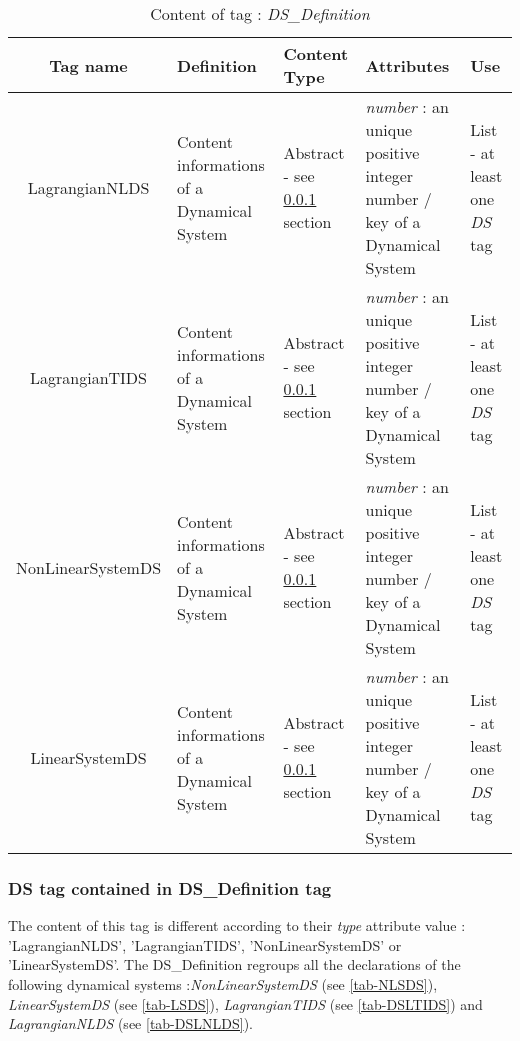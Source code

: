 \begin{table}[!hbp]
\begin{center}
\begin{tabular}{|c|p{2.5cm}|p{2cm}|p{5cm}|p{1.5cm}|}
\hline
\bf{Tag name} & \bf{Definition} & \bf{Content Type} & \bf{Attributes} & \bf{Use}
\\\hline
\hline
LagrangianNLDS	& Content informations of a Dynamical System & Abstract - see \ref{DSDSDefinitionTag} section& \textit{number} : an
unique positive integer number / key of a Dynamical System &  List - at least one \textit{DS} tag\\
LagrangianTIDS	& Content informations of a Dynamical System & Abstract - see \ref{DSDSDefinitionTag} section& \textit{number} : an
unique positive integer number / key of a Dynamical System &  List - at least one \textit{DS} tag\\
NonLinearSystemDS	& Content informations of a Dynamical System & Abstract - see \ref{DSDSDefinitionTag} section& \textit{number} : an
unique positive integer number / key of a Dynamical System &  List - at least one \textit{DS} tag\\
LinearSystemDS	& Content informations of a Dynamical System & Abstract - see \ref{DSDSDefinitionTag} section& \textit{number} : an
unique positive integer number / key of a Dynamical System &  List - at least one \textit{DS} tag\\
\hline
\end{tabular}
\end{center}
\caption{Content of tag : \textit{DS\_Definition}}
\label{tab-DSDefinition}
\end{table}



\subsubsection{DS tag contained in DS\_Definition tag}
\label{DSDSDefinitionTag}

The content of this tag is different according to their \textit{type} attribute value : 'LagrangianNLDS',
'LagrangianTIDS', 'NonLinearSystemDS' or 'LinearSystemDS'.
The DS\_Definition regroups all the declarations of the following dynamical systems :\textit{NonLinearSystemDS} (see \ref{tab-NLSDS}),
\textit{LinearSystemDS} (see \ref{tab-LSDS}), \textit{LagrangianTIDS} (see \ref{tab-DSLTIDS}) and
\textit{LagrangianNLDS} (see \ref{tab-DSLNLDS}).\\

